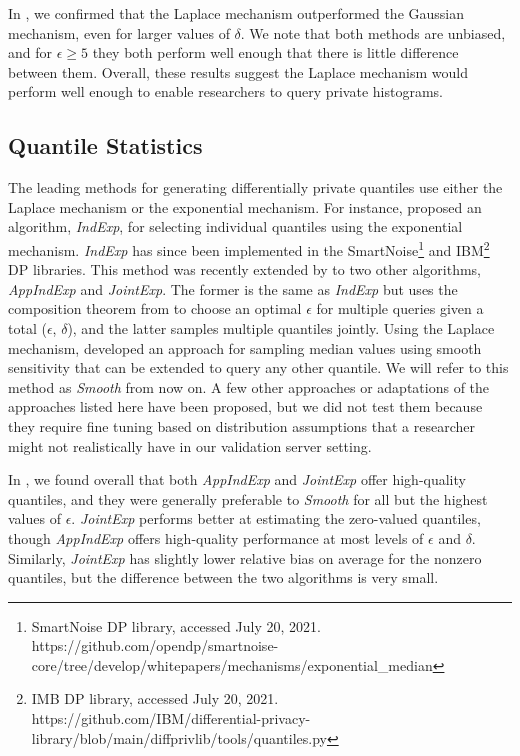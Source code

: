 In \citet{barrientos2021}, we confirmed that the Laplace mechanism outperformed the Gaussian mechanism, even for larger values of $\delta$. We note that both methods are unbiased, and for $\epsilon \geq 5$ they both perform well enough that there is little difference between them. Overall, these results suggest the Laplace mechanism would perform well enough to enable researchers to query private histograms.

\subsection{Quantile Statistics}
The leading methods for generating differentially private quantiles use either the Laplace mechanism or the exponential mechanism. For instance, \citet{smith2011privacy} proposed an algorithm, \textit{IndExp}, for selecting individual quantiles using the exponential mechanism. \textit{IndExp} has since been implemented in the SmartNoise\footnote{SmartNoise DP library, accessed July 20, 2021. https://github.com/opendp/smartnoise-core/tree/develop/whitepapers/mechanisms/exponential\_median} and IBM\footnote{IMB DP library, accessed July 20, 2021. https://github.com/IBM/differential-privacy-library/blob/main/diffprivlib/tools/quantiles.py} DP libraries. This method was recently extended by \citet{gillenwater2021differentially} to two other algorithms, \textit{AppIndExp} and \textit{JointExp}. The former is the same as \textit{IndExp} but uses the composition theorem from \citet{dong2020optimal} to choose an optimal $\epsilon$ for multiple queries given a total ($\epsilon$, $\delta$), and the latter samples multiple quantiles jointly. Using the Laplace mechanism, \citet{nissim2007smooth} developed an approach for sampling median values using smooth sensitivity that can be extended to query any other quantile. We will refer to this method as \textit{Smooth} from now on. A few other approaches or adaptations of the approaches listed here have been proposed, but we did not test them because they require fine tuning based on distribution assumptions that a researcher might not realistically have in our validation server setting.

In \citet{barrientos2021}, we found overall that both \textit{AppIndExp} and \textit{JointExp} offer high-quality quantiles, and they were generally preferable to \textit{Smooth} for all but the highest values of $\epsilon$. \textit{JointExp} performs better at estimating the zero-valued quantiles, though \textit{AppIndExp} offers high-quality performance at most levels of $\epsilon$ and $\delta$. Similarly, \textit{JointExp} has slightly lower relative bias on average for the nonzero quantiles, but the difference between the two algorithms is very small. 

